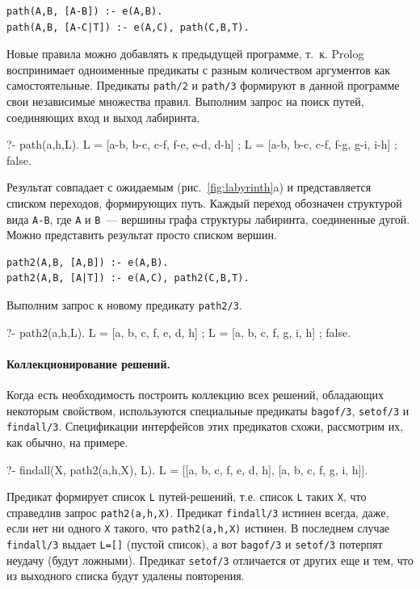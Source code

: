 \documentclass[a4paper,14pt, openany, twoside, draft]{extbook} %
\begin{document}
\begin{verbatim}
path(A,B, [A-B]) :- e(A,B).
path(A,B, [A-C|T]) :- e(A,C), path(C,B,T).
\end{verbatim}

  Новые правила можно добавлять к предыдущей программе, т.~к. Prolog воспринимает одноименные предикаты с разным количеством аргументов как самостоятельные.  Предикаты \texttt{path/2} и \texttt{path/3} формируют в данной программе свои независимые множества правил.  Выполним запрос на поиск путей, соединяющих вход и выход лабиринта.

\begin{proexp}
?- path(a,h,L).
L = [a-b, b-c, c-f, f-e, e-d, d-h] ;
L = [a-b, b-c, c-f, f-g, g-i, i-h] ;
false.
\end{proexp}

Результат совпадает с ожидаемым (рис.~\ref{fig:labyrinth}a) и представляется списком переходов, формирующих путь.  Каждый переход обозначен структурой вида \texttt{A-B}, где \texttt{A} и \texttt{B}~--- вершины графа структуры лабиринта, соединенные дугой.  Можно представить результат просто списком вершин.

\begin{verbatim}
path2(A,B, [A,B]) :- e(A,B).
path2(A,B, [A|T]) :- e(A,C), path2(C,B,T).
\end{verbatim}

\noindent{}Выполним запрос к новому предикату \texttt{path2/3}.

\begin{proexp}
?- path2(a,h,L).
L = [a, b, c, f, e, d, h] ;
L = [a, b, c, f, g, i, h] ;
false.
\end{proexp}

\paragraph{Коллекционирование решений.} Когда есть необходимость построить коллекцию всех решений, обладающих некоторым свойством, используются специальные предикаты \texttt{bagof/3}, \texttt{setof/3} и \texttt{findall/3}.  Спецификации интерфейсов этих предикатов схожи, рассмотрим их, как обычно, на примере.

\begin{proexp}
?- findall(X, path2(a,h,X), L).
L = [[a, b, c, f, e, d, h], [a, b, c, f, g, i, h]].
\end{proexp}

\noindent{}Предикат формирует список \texttt{L} путей-решений, т.е. список \texttt{L} таких \texttt{X}, что справедлив запрос \texttt{path2(a,h,X)}.  Предикат \texttt{findall/3} истинен всегда, даже, если нет ни одного \texttt{X} такого, что \texttt{path2(a,h,X)} истинен.  В последнем случае \texttt{findall/3} выдает \texttt{L=[]} (пустой список), а вот \texttt{bagof/3} и \texttt{setof/3} потерпят неудачу (будут ложными).  Предикат \texttt{setof/3} отличается от других еще и тем, что из выходного списка будут удалены повторения.
\end{document}
